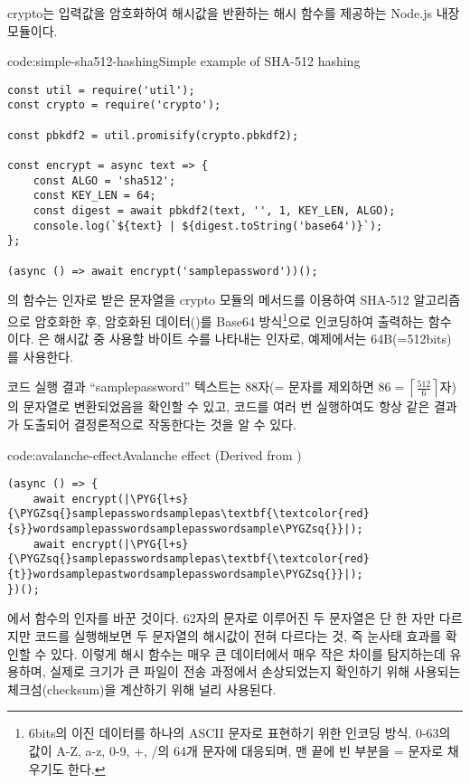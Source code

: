 crypto는 입력값을 암호화하여 해시값을 반환하는 해시 함수를 제공하는 Node.js 내장 모듈이다.

\begin{code}{code:simple-sha512-hashing}{Simple example of SHA-512 hashing}
\begin{verbatim}
const util = require('util');
const crypto = require('crypto');

const pbkdf2 = util.promisify(crypto.pbkdf2);

const encrypt = async text => {
    const ALGO = 'sha512';
    const KEY_LEN = 64;
    const digest = await pbkdf2(text, '', 1, KEY_LEN, ALGO);
    console.log(`${text} | ${digest.toString('base64')}`);
};

(async () => await encrypt('samplepassword'))();
\end{verbatim}
\end{code}

의  함수는 인자로 받은 문자열을 crypto 모듈의  메서드를 이용하여 SHA-512 알고리즘으로 암호화한 후, 암호화된 데이터()를 Base64 방식\footnote{6bits의 이진 데이터를 하나의 ASCII 문자로 표현하기 위한 인코딩 방식. 0-63의 값이 A-Z, a-z, 0-9, +, /의 64개 문자에 대응되며, 맨 끝에 빈 부분을 = 문자로 채우기도 한다.}으로 인코딩하여 출력하는 함수이다. 은 해시값 중 사용할 바이트 수를 나타내는 인자로, 예제에서는 64B(=512bits)를 사용한다.

코드 실행 결과 ``samplepassword'' 텍스트는 88자(= 문자를 제외하면 $86=\left\lceil\frac{512}{6}\right\rceil$자)의 문자열로 변환되었음을 확인할 수 있고, 코드를 여러 번 실행하여도 항상 같은 결과가 도출되어 결정론적으로 작동한다는 것을 알 수 있다.

\begin{code}{code:avalanche-effect}{Avalanche effect (Derived from )}
\begin{verbatim}
(async () => {
    await encrypt(|\PYG{l+s}{\PYGZsq{}samplepasswordsamplepas\textbf{\textcolor{red}{s}}wordsamplepasswordsamplepasswordsample\PYGZsq{}}|);
    await encrypt(|\PYG{l+s}{\PYGZsq{}samplepasswordsamplepas\textbf{\textcolor{red}{t}}wordsamplepastwordsamplepasswordsample\PYGZsq{}}|);
})();
\end{verbatim}
\end{code}

\는 에서  함수의 인자를 바꾼 것이다. 62자의 문자로 이루어진 두 문자열은 단 한 자만 다르지만 코드를 실행해보면 두 문자열의 해시값이 전혀 다르다는 것, 즉 눈사태 효과를 확인할 수 있다. 이렇게 해시 함수는 매우 큰 데이터에서 매우 작은 차이를 탐지하는데 유용하며, 실제로 크기가 큰 파일이 전송 과정에서 손상되었는지 확인하기 위해 사용되는 체크섬(checksum)을 계산하기 위해 널리 사용된다.

